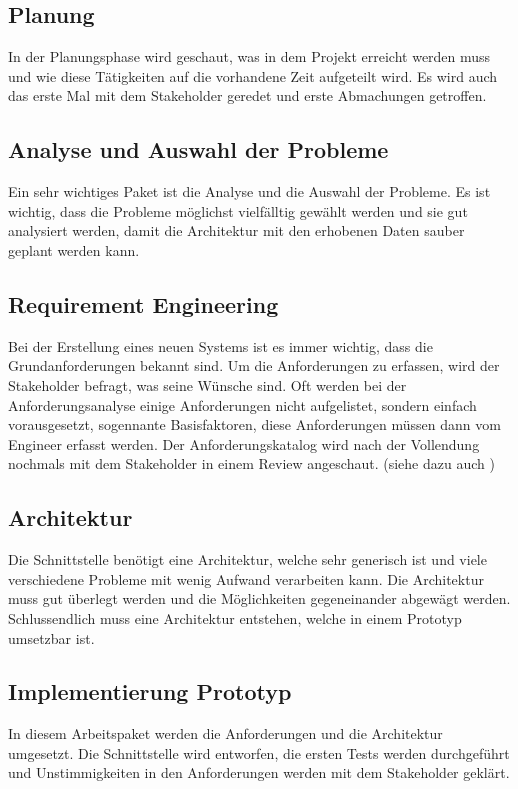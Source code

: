 \subsection{Planung}\label{planung}
In der Planungsphase wird geschaut, was in dem Projekt erreicht werden muss und wie diese Tätigkeiten auf die vorhandene Zeit aufgeteilt wird. Es wird auch das erste Mal mit dem Stakeholder geredet und erste Abmachungen getroffen.

\subsection{Analyse und Auswahl der Probleme}\label{analyse_auswahl_probleme}
Ein sehr wichtiges Paket ist die Analyse und die Auswahl der Probleme. Es ist wichtig, dass die Probleme möglichst vielfälltig gewählt werden und sie gut analysiert werden, damit die Architektur mit den erhobenen Daten sauber geplant werden kann.

\subsection{Requirement Engineering}\label{rqe}
Bei der Erstellung eines neuen Systems ist es immer wichtig, dass die Grundanforderungen bekannt sind. Um die Anforderungen zu erfassen, wird der Stakeholder befragt, was seine Wünsche sind. Oft werden bei der Anforderungsanalyse einige Anforderungen nicht aufgelistet, sondern einfach vorausgesetzt, sogennante Basisfaktoren, diese Anforderungen müssen dann vom Engineer erfasst werden. Der Anforderungskatalog wird nach der Vollendung nochmals mit dem Stakeholder in einem Review angeschaut. (siehe dazu auch \cite{req_eng_book})

\subsection{Architektur}\label{ref_backend}
Die Schnittstelle benötigt eine Architektur, welche sehr generisch ist und viele verschiedene Probleme mit wenig Aufwand verarbeiten kann. Die Architektur muss gut überlegt werden und die Möglichkeiten gegeneinander abgewägt werden. Schlussendlich muss eine Architektur entstehen, welche in einem Prototyp umsetzbar ist.

\subsection{Implementierung Prototyp}\label{eng_prototyp}
In diesem Arbeitspaket werden die Anforderungen und die Architektur umgesetzt. Die Schnittstelle wird entworfen, die ersten Tests werden durchgeführt und Unstimmigkeiten in den Anforderungen werden mit dem Stakeholder geklärt.

